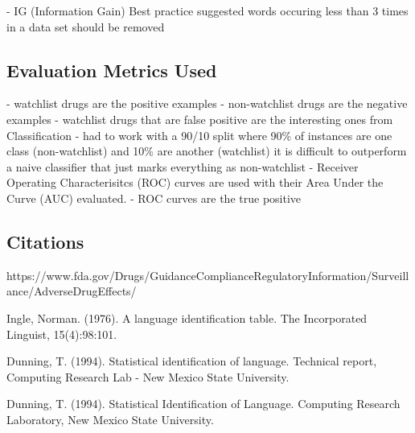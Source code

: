 \documentclass[twoside,11pt]{article}
\begin{document}
- IG (Information Gain)
Best practice suggested words occuring less than 3 times in a data set should be removed

\subsection{Evaluation Metrics Used}
- watchlist drugs are the positive examples
- non-watchlist drugs are the negative examples
- watchlist drugs that are false positive are the interesting ones from Classification
- had to work with a 90/10 split where 90\% of instances are one class (non-watchlist) and 10\% are another
(watchlist) it is difficult to outperform a naive classifier that just marks everything as non-watchlist
- Receiver Operating Characterisitcs (ROC) curves are used with their Area Under the Curve (AUC)
evaluated.
- ROC curves are the true positive




\subsection{Citations}
https://www.fda.gov/Drugs/GuidanceComplianceRegulatoryInformation/Surveillance/AdverseDrugEffects/


Ingle, Norman. (1976). A language identification table.
The Incorporated Linguist, 15(4):98:101.

Dunning, T. (1994). Statistical identification of language. Technical report, Computing
Research Lab - New Mexico State University.


Dunning, T. (1994). Statistical Identification of Language. Computing Research Laboratory,
New Mexico State University.



\vskip 0.2in

\end{document}
